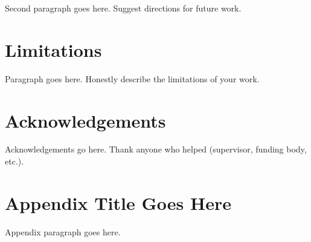 \documentclass[11pt]{article}
\begin{document}
Second paragraph goes here. Suggest directions for future work.


\section*{Limitations}

Paragraph goes here. Honestly describe the limitations of your work.

\section*{Acknowledgements}

Acknowledgements go here. Thank anyone who helped (supervisor, funding body, etc.).

%
%
%
%



\appendix

\section{Appendix Title Goes Here}
\label{sec:appendix-a}

Appendix paragraph goes here.
\end{document}
